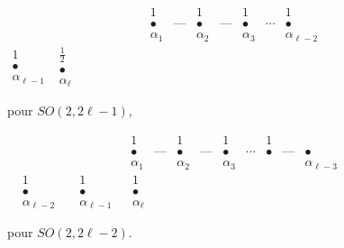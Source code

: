 \documentclass[11pt]{amsart}
\theoremstyle{plain}
\theoremstyle{definition}
\theoremstyle{remark}
\begin{document}
\vspace{0.5cm}
\noindent\begin{minipage}{0.48\textwidth}
\centering
\begin{equation*}
\begin{array}{ccccccc}
1 & & 1 & & 1 & & 1 \\
\bullet & \text{---} & \bullet & \text{---} & \bullet & \cdots & \bullet \\
\alpha_1 & & \alpha_2 & & \alpha_3 & & \alpha_{\ell-2}
\end{array}
\end{equation*}
\vspace{0.2cm}
$\begin{array}{c}1\\\bullet\\\alpha_{\ell-1}\end{array}$
\vspace{0.2cm}
$\begin{array}{c}\frac{1}{2}\\\bullet\\\alpha_\ell\end{array}$

\vspace{0.3cm}
pour $SO(2,2\ell-1)$,
\end{minipage}
\hfill
\begin{minipage}{0.48\textwidth}
\centering
\begin{equation*}
\begin{array}{cccccccc}
1 & & 1 & & 1 & & 1 \\
\bullet & \text{---} & \bullet & \text{---} & \bullet & \cdots & \bullet & \text{---} & \bullet \\
\alpha_1 & & \alpha_2 & & \alpha_3 & & & & \alpha_{\ell-3}
\end{array}
\end{equation*}
\vspace{0.2cm}
$\begin{array}{ccc}&1&\\&\bullet&\\&\alpha_{\ell-2}&\end{array}$
\vspace{0.2cm}
$\begin{array}{ccc}1&&1\\\bullet&&\bullet\\\alpha_{\ell-1}&&\alpha_\ell\end{array}$

\vspace{0.3cm}
pour $SO(2,2\ell-2)$.
\end{minipage}
\end{document}
